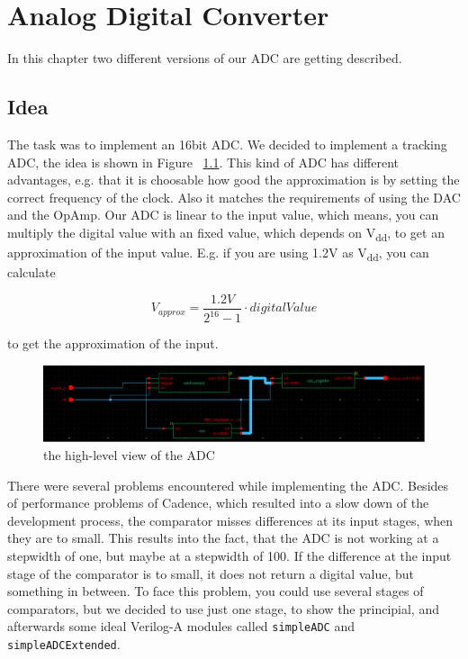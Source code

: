 \chapter{Analog Digital Converter}

In this chapter two different versions of our ADC are getting described.

\section{Idea}

The task was to implement an 16bit ADC. We decided to implement a tracking ADC, the idea is shown in Figure ~\ref{fig:wholeADC}. This kind of ADC has different advantages, e.g. that it is choosable how good the approximation is by setting the correct frequency of the clock. Also it matches the requirements of using the DAC and the OpAmp. Our ADC is linear to the input value, which means, you can multiply the digital value with an fixed value, which depends on V\textsubscript{dd}, to get an approximation of the input value. E.g. if you are using 1.2V as V\textsubscript{dd}, you can calculate 

\[
	V_{approx} = \frac{1.2V}{2^{16} - 1} \cdot digitalValue
\]

to get the approximation of the input.

\begin{figure}[h]
	\centering
	\includegraphics[scale=0.5]{images/adc/adc.png}
	\caption{the high-level view of the ADC}
	\label{fig:wholeADC}
\end{figure} 

There were several problems encountered while implementing the ADC. Besides of performance problems of Cadence, which resulted into a slow down of the development process, the comparator misses differences at its input stages, when they are to small. This results into the fact, that the ADC is not working at a stepwidth of one, but maybe at a stepwidth of 100. If the difference at the input stage of the comparator is to small, it does not return a digital value, but something in between. To face this problem, you could use several stages of comparators, but we decided to use just one stage, to show the principial, and afterwards some ideal Verilog-A modules called \texttt{simpleADC} and \texttt{simpleADCExtended}. 

